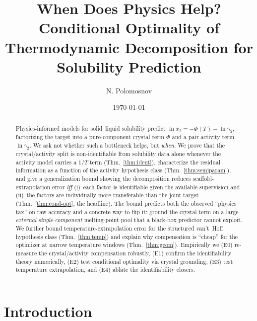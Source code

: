 \documentclass[11pt]{article}
\title{When Does Physics Help? Conditional Optimality of Thermodynamic
Decomposition for Solubility Prediction}
\author{N. Polomosnov \and \pending[co-authors]}
\date{\today}
\newcommand{\lnx}{\ln x_2}
\newcommand{\Phicry}{\Phi}
\newcommand{\lng}{\ln\gamma_2}
\begin{document}
\maketitle

\begin{abstract}
Physics-informed models for solid--liquid solubility predict
$\lnx = -\Phicry(T) - \lng$, factorizing the target into a pure-component
crystal term $\Phicry$ and a pair activity term $\lng$. We ask not whether such a
bottleneck helps, but \emph{when}. We prove that the crystal/activity split is
non-identifiable from solubility data alone whenever the activity model carries a
$1/T$ term (Thm.~\ref{thm:ident}), characterize the residual information as a
function of the activity hypothesis class (Thm.~\ref{thm:semiparam}), and give a
generalization bound showing the decomposition reduces scaffold-extrapolation
error \emph{iff} (i)~each factor is identifiable given the available supervision
and (ii)~the factors are individually more transferable than the joint target
(Thm.~\ref{thm:cond-opt}, the headline). The bound predicts both the observed
``physics tax'' on raw accuracy and a concrete way to flip it: ground the crystal
term on a large \emph{external single-component} melting-point pool that a
black-box predictor cannot exploit. We further bound temperature-extrapolation
error for the structured van't~Hoff hypothesis class (Thm.~\ref{thm:temp}) and
explain why compensation is ``cheap'' for the optimizer at narrow temperature
windows (Thm.~\ref{thm:geom}). Empirically we (E0) re-measure the
crystal/activity compensation robustly, (E1) confirm the identifiability theory
numerically, (E2) test conditional optimality via crystal grounding, (E3) test
temperature extrapolation, and (E4) ablate the identifiability closers.
\end{abstract}

\section{Introduction}
\label{sec:intro}
\end{document}
